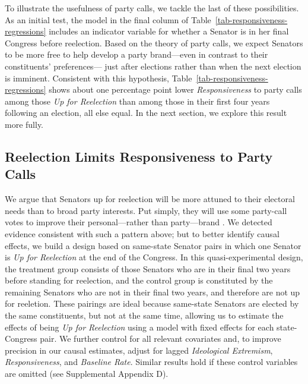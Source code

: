 \documentclass[12pt]{article}
\begin{document}
To illustrate the usefulness of party calls, we tackle the last of these possibilities. As an initial test, the model in the final column of Table~\ref{tab-responsiveness-regressions} includes an indicator variable for whether a Senator is in her final Congress before reelection.
Based on the theory of party calls,
we expect Senators to be more free to help develop a party brand---even
in contrast to their constituents' preferences---
just after elections
rather than when the next election is imminent.
Consistent with this hypothesis, Table~\ref{tab-responsiveness-regressions} shows about one percentage point lower \textit{Responsiveness} to party calls among those \textit{Up for Reelection} than among those in their first four years following an election, all else equal.  In the next section, we explore this result more fully.

\subsection*{Reelection Limits Responsiveness to Party Calls}

We argue that Senators up for reelection will be more attuned to their electoral needs than to broad party interests. Put simply, they will use some party-call votes to improve their personal---rather than party---brand
\citep[e.g.,][]{Canes-Wrone:2002, Carson:2010}.  We detected evidence consistent with such a pattern above; but to better identify causal effects, we build a design based on same-state Senator pairs in which one Senator is \textit{Up for Reelection} at the end of the Congress.
In this quasi-experimental design, the treatment group consists of those Senators who are in their final two years before standing for reelection, and the control group is constituted by the remaining Senators who are not in their final two years, and therefore are not up for reeletion.
These pairings are ideal because same-state Senators are elected by the same constituents, but not at the same time, allowing us to estimate the effects of being \textit{Up for Reelection} using a model with fixed effects for each state-Congress pair.  We further control for all relevant covariates and, to improve precision in our causal estimates, adjust for lagged \textit{Ideological Extremism}, \textit{Responsiveness}, and \textit{Baseline Rate}. Similar results hold if these control variables are omitted (see Supplemental Appendix D).
\end{document}
